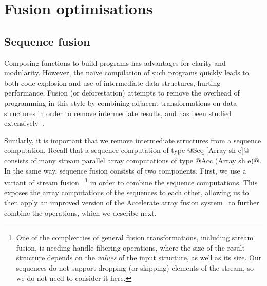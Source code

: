 \section{Fusion optimisations}
\label{sec:Optimisation}

\subsection{Sequence fusion}

Composing functions to build programs has advantages for clarity and modularity.
However, the na\"ive compilation of such programs quickly leads to both code
explosion and use of intermediate data structures, hurting performance. Fusion
(or deforestation) attempts to remove the overhead of programming in this style
by combining adjacent transformations on data structures in order to remove
intermediate results, and has been studied
extensively~\cite{Wadler:1990ix,Coutts:stream-fusion,Lippmeier:Guiding,McDonell:acc-optim}.

Similarly, it is important that we remove intermediate structures from a sequence
computation. Recall that a sequence computation of type @Seq [Array sh e]@
consists of many stream parallel array computations of type @Acc (Array sh e)@.
In the same way, sequence fusion consists of two components.
First, we use a variant of stream fusion~\cite{Coutts:stream-fusion}%
\footnote{One of the complexities of general fusion transformations, including
stream fusion, is needing handle filtering operations, where the size of the
result structure depends on the \emph{values} of the input structure, as well as
its size. Our sequences do not support dropping (or skipping) elements of the
stream, so we do not need to consider it here.}
in order to combine the sequence computations. This exposes the array
computations of the sequences to each other, allowing us to then apply an
improved version of the Accelerate array fusion system~\cite{McDonell:acc-optim}
to further combine the operations, which we describe next.



